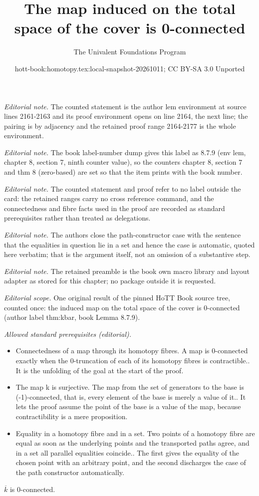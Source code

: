 \documentclass[10pt,a4paper]{article}
\title{The map induced on the total space of the cover is 0-connected}
\author{The Univalent Foundations Program}
\date{hott-book:homotopy.tex:local-snapshot-20261011; CC BY-SA 3.0 Unported}
\newcounter{chapter}
\newcommand{\kbar}{\overline{k}} %
\theoremstyle{definition}
\theoremstyle{remark}
\numberwithin{equation}{section}
\begin{document}
\maketitle
\setcounter{chapter}{8}
\setcounter{section}{7}
\setcounter{thm}{8}
\noindent\textit{Editorial note.} The counted statement is the author lem environment at source lines 2161-2163 and its proof environment opens on line 2164, the next line; the pairing is by adjacency and the retained proof range 2164-2177 is the whole environment.\par\medskip
\noindent\textit{Editorial note.} The book label-number dump gives this label as 8.7.9 (env lem, chapter 8, section 7, ninth counter value), so the counters chapter 8, section 7 and thm 8 (zero-based) are set so that the item prints with the book number.\par\medskip
\noindent\textit{Editorial note.} The counted statement and proof refer to no label outside the card: the retained ranges carry no cross reference command, and the connectedness and fibre facts used in the proof are recorded as standard prerequisites rather than treated as delegations.\par\medskip
\noindent\textit{Editorial note.} The authors close the path-constructor case with the sentence that the equalities in question lie in a set and hence the case is automatic, quoted here verbatim; that is the argument itself, not an omission of a substantive step.\par\medskip
\noindent\textit{Editorial note.} The retained preamble is the book own macro library and layout adapter as stored for this chapter; no package outside it is requested.\par\medskip
\noindent\textit{Editorial scope.} One original result of the pinned HoTT Book source tree, counted once: the induced map on the total space of the cover is 0-connected (author label thm:kbar, book Lemma 8.7.9).\par\medskip
\noindent\textit{Allowed standard prerequisites (editorial).}\begin{itemize}
\item Connectedness of a map through its homotopy fibres. A map is 0-connected exactly when the 0-truncation of each of its homotopy fibres is contractible.. It is the unfolding of the goal at the start of the proof.
\item The map k is surjective. The map from the set of generators to the base is (-1)-connected, that is, every element of the base is merely a value of it.. It lets the proof assume the point of the base is a value of the map, because contractibility is a mere proposition.
\item Equality in a homotopy fibre and in a set. Two points of a homotopy fibre are equal as soon as the underlying points and the transported paths agree, and in a set all parallel equalities coincide.. The first gives the equality of the chosen point with an arbitrary point, and the second discharges the case of the path constructor automatically.
\end{itemize}\medskip
\begin{lem}\label{thm:kbar}
  $\kbar$ is 0-connected.
\end{lem}
\end{document}

